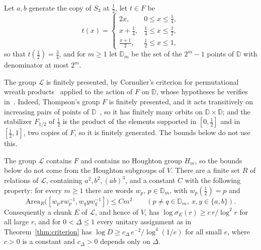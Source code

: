 Let $a,b$ generate the copy of $S_3$ at $\frac12$, let $t\in F$ be
\[
t(x)=\begin{cases}2x,&0\le x\le\frac14,\\ x+\frac14,&\frac14\le x\le\frac12,\\ \frac{x+1}2,&\frac12\le x\le1,\end{cases}
\]
so that $t(\frac12)=\frac34$, and for $m\ge1$ let $\mathbb D_m$ be the set of the $2^m-1$ points of $\mathbb D$ with denominator at most
$2^m$.

The group $\mathcal L$ is finitely presented, by Cornulier's criterion for permutational wreath products~\cite[Theorem~1.1]{Cornulier2006}
applied to the action of $F$ on $\mathbb D$, whose hypotheses he verifies in~\cite[Example~3.4]{Cornulier2006}. Indeed, Thompson's group $F$ is
finitely presented, and it acts transitively on increasing pairs of points of $\mathbb D$~\cite[Lemma~4.2]{CFP1996}, so it has finitely many
orbits on $\mathbb D\times\mathbb D$; and the stabilizer $F_{1/2}$ of $\frac12$ is the product of the elements supported in $[0,\frac12]$ and in
$[\frac12,1]$, two copies of $F$, so it is finitely generated. The bounds below do not use this.

\begin{proposition}\label{prop:thompson}
The group $\mathcal L$ contains $F$ and contains no Houghton group $H_m$, so the bounds below do not come from the
Houghton subgroups of $V$. There are a finite set $R$ of relations of $\mathcal L$, containing $a^2,b^2,(ab)^3$, and a constant $C$ with the
following property: for every $m\ge1$ there are words $w_p$, $p\in\mathbb D_m$, with $w_p(\frac12)=p$ and
\[
\mathrm{Area}_R\bigl([w_pxw_p^{-1},w_qyw_q^{-1}]\bigr)\le Cm^2\qquad(p\ne q\in\mathbb D_m,\ x,y\in\{a,b\}).
\]
Consequently a chunk $E$ of $\mathcal L$, and hence of $V$, has $\log\sigma_E(r)\ge c\,r/\log^2r$ for all large $r$, and for $0<\Delta\le1$
every unitary assignment as in Theorem~\ref{thm:criterion} has $\log D\ge c_\Delta\,e^{-2}/\log^4(1/e)$ for all small $e$, where $c>0$ is a
constant and $c_\Delta>0$ depends only on $\Delta$.
\end{proposition}

